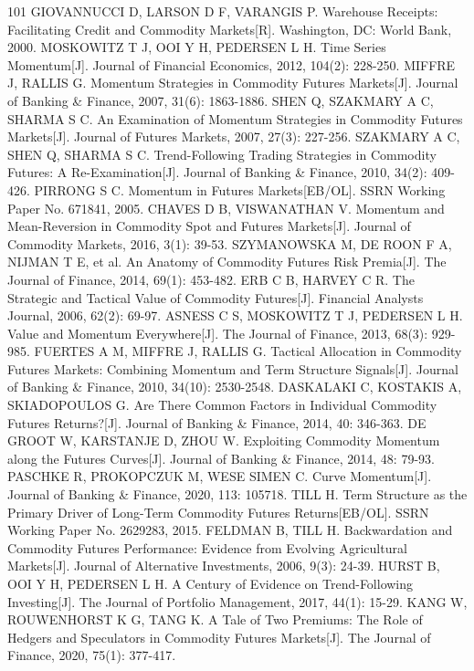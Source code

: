 \documentclass[12pt,a4paper]{ctexart}
\begin{document}
\begin{thebibliography}{101}
 GIOVANNUCCI D, LARSON D F, VARANGIS P. Warehouse Receipts: Facilitating Credit and Commodity Markets[R]. Washington, DC: World Bank, 2000.
 MOSKOWITZ T J, OOI Y H, PEDERSEN L H. Time Series Momentum[J]. Journal of Financial Economics, 2012, 104(2): 228-250.
 MIFFRE J, RALLIS G. Momentum Strategies in Commodity Futures Markets[J]. Journal of Banking \& Finance, 2007, 31(6): 1863-1886.
 SHEN Q, SZAKMARY A C, SHARMA S C. An Examination of Momentum Strategies in Commodity Futures Markets[J]. Journal of Futures Markets, 2007, 27(3): 227-256.
 SZAKMARY A C, SHEN Q, SHARMA S C. Trend-Following Trading Strategies in Commodity Futures: A Re-Examination[J]. Journal of Banking \& Finance, 2010, 34(2): 409-426.
 PIRRONG S C. Momentum in Futures Markets[EB/OL]. SSRN Working Paper No. 671841, 2005.
 CHAVES D B, VISWANATHAN V. Momentum and Mean-Reversion in Commodity Spot and Futures Markets[J]. Journal of Commodity Markets, 2016, 3(1): 39-53.
 SZYMANOWSKA M, DE ROON F A, NIJMAN T E, et al. An Anatomy of Commodity Futures Risk Premia[J]. The Journal of Finance, 2014, 69(1): 453-482.
 ERB C B, HARVEY C R. The Strategic and Tactical Value of Commodity Futures[J]. Financial Analysts Journal, 2006, 62(2): 69-97.
 ASNESS C S, MOSKOWITZ T J, PEDERSEN L H. Value and Momentum Everywhere[J]. The Journal of Finance, 2013, 68(3): 929-985.
 FUERTES A M, MIFFRE J, RALLIS G. Tactical Allocation in Commodity Futures Markets: Combining Momentum and Term Structure Signals[J]. Journal of Banking \& Finance, 2010, 34(10): 2530-2548.
 DASKALAKI C, KOSTAKIS A, SKIADOPOULOS G. Are There Common Factors in Individual Commodity Futures Returns?[J]. Journal of Banking \& Finance, 2014, 40: 346-363.
 DE GROOT W, KARSTANJE D, ZHOU W. Exploiting Commodity Momentum along the Futures Curves[J]. Journal of Banking \& Finance, 2014, 48: 79-93.
 PASCHKE R, PROKOPCZUK M, WESE SIMEN C. Curve Momentum[J]. Journal of Banking \& Finance, 2020, 113: 105718.
 TILL H. Term Structure as the Primary Driver of Long-Term Commodity Futures Returns[EB/OL]. SSRN Working Paper No. 2629283, 2015.
 FELDMAN B, TILL H. Backwardation and Commodity Futures Performance: Evidence from Evolving Agricultural Markets[J]. Journal of Alternative Investments, 2006, 9(3): 24-39.
 HURST B, OOI Y H, PEDERSEN L H. A Century of Evidence on Trend-Following Investing[J]. The Journal of Portfolio Management, 2017, 44(1): 15-29.
 KANG W, ROUWENHORST K G, TANG K. A Tale of Two Premiums: The Role of Hedgers and Speculators in Commodity Futures Markets[J]. The Journal of Finance, 2020, 75(1): 377-417.

\end{thebibliography}
\end{document}

